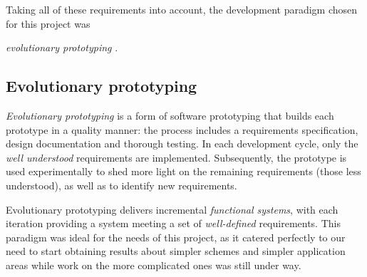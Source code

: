 \documentclass[12pt,twoside,notitlepage,amsart]{report} %
\begin{document}
	Taking all of these requirements into account, the development paradigm chosen for this project was {\emph{evolutionary prototyping} \cite{Davis92}.
	
	\subsection{Evolutionary prototyping}
	
	
	
	{\emph{Evolutionary prototyping}} is a form of software prototyping that builds each prototype in a quality manner: the process includes a requirements specification, design documentation and thorough testing. In each development cycle, only the \emph{well understood} requirements are implemented. Subsequently, the prototype is used experimentally to shed more light on the remaining requirements (those less understood), as well as to identify new requirements. 
	
	Evolutionary prototyping delivers incremental \emph{functional systems}, with {each iteration} providing a system meeting a set of \emph{well-defined} requirements. This paradigm was ideal for the needs of this project, as it catered perfectly to our need to start obtaining results about simpler schemes and simpler application areas while work on the more complicated ones was still under way.	
	
}
\end{document}
